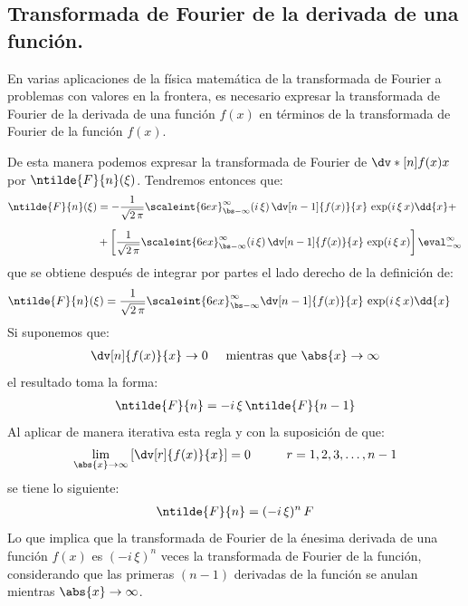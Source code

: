 \subsection{Transformada de Fourier de la derivada de una función.}

En varias aplicaciones de la física matemática de la transformada de Fourier a problemas con valores en la frontera, es necesario expresar la transformada de Fourier de la derivada de una función $f (x)$ en términos de la transformada de Fourier de la función $f (x)$.
\par
De esta manera podemos expresar la transformada de Fourier de \hfill \break
$\dv*[n]{f (x)}{x}$ por $\ntilde{F}{n} (\xi)$. Tendremos entonces que:
\begin{align*}
\ntilde{F}{n}(\xi) &= -\dfrac{1}{\sqrt{2 \, \pi}} \scaleint{6ex}_{\bs -\infty}^{\infty} (i \, \xi) \, \dv[n-1]{f (x)}{x} \, \exp(i \, \xi \, x) \dd{x} + \\[0.5em]
&+ \left[ \dfrac{1}{\sqrt{2 \, \pi}} \scaleint{6ex}_{\bs -\infty}^{\infty} (i \, \xi) \, \dv[n-1]{f (x)}{x} \, \exp(i \, \xi \, x) \right] \eval_{-\infty}^{\infty}
\end{align*}
que se obtiene después de integrar por partes el lado derecho de la definición de:
\begin{align}
\ntilde{F}{n}(\xi) &= \dfrac{1}{\sqrt{2 \, \pi}} \scaleint{6ex}_{\bs -\infty}^{\infty} \dv[n-1]{f (x)}{x} \, \exp(i \, \xi \, x) \dd{x}
\label{eq:ecuacion_01_36}
\end{align}
Si suponemos que:
\begin{align*}
\dv[n]{f (x)}{x} \to 0 \hspace{0.5cm} \mbox{mientras que  } \abs{x} \to \infty
\end{align*}
el resultado toma la forma:
\begin{align*}
\ntilde{F}{n} = - i \, \xi \, \ntilde{F}{n-1}
\end{align*}
Al aplicar de manera iterativa esta regla y con la suposición de que:
\begin{align*}
\lim_{\abs{x} \to \infty} \left[ \dv[r]{f (x)}{x} \right] = 0 \hspace{1cm} r = 1, 2, 3, \ldots, n-1
\end{align*}
se tiene lo siguiente:
\begin{align*}
\ntilde{F}{n} = (- i \, \xi)^{n} \, F
\end{align*}
Lo que implica que la transformada de Fourier de la énesima derivada de una función $f (x)$ es $(- i \, \xi)^{n}$ veces la transformada de Fourier de la función, considerando que las primeras $(n - 1)$ derivadas de la función se anulan mientras $\abs{x} \to \infty$.
